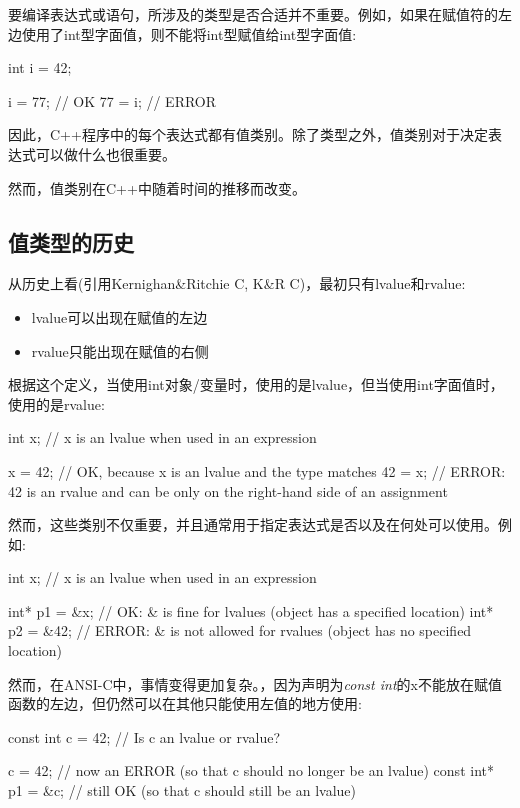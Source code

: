 要编译表达式或语句，所涉及的类型是否合适并不重要。例如，如果在赋值符的左边使用了int型字面值，则不能将int型赋值给int型字面值:

\begin{cppcode}
int i = 42;

i = 77; // OK
77 = i; // ERROR
\end{cppcode}

因此，C++程序中的每个表达式都有值类别。除了类型之外，值类别对于决定表达式可以做什么也很重要。

然而，值类别在C++中随着时间的推移而改变。

\subsection{值类型的历史}

从历史上看(引用Kernighan\&Ritchie C, K\&R C)，最初只有lvalue和rvalue:

\begin{itemize}
	\item lvalue可以出现在赋值的左边
	\item rvalue只能出现在赋值的右侧
\end{itemize}

根据这个定义，当使用int对象/变量时，使用的是lvalue，但当使用int字面值时，使用的是rvalue:

\begin{cppcode}
int x; // x is an lvalue when used in an expression

x = 42; // OK, because x is an lvalue and the type matches
42 = x; // ERROR: 42 is an rvalue and can be only on the right-hand side of an assignment
\end{cppcode}

然而，这些类别不仅重要，并且通常用于指定表达式是否以及在何处可以使用。例如:

\begin{cppcode}
int x; // x is an lvalue when used in an expression

int* p1 = &x; // OK: & is fine for lvalues (object has a specified location)
int* p2 = &42; // ERROR: & is not allowed for rvalues (object has no specified location)
\end{cppcode}

然而，在ANSI-C中，事情变得更加复杂。，因为声明为\textit{const int}的x不能放在赋值函数的左边，但仍然可以在其他只能使用左值的地方使用:

\begin{cppcode}
const int c = 42; // Is c an lvalue or rvalue?

c = 42; // now an ERROR (so that c should no longer be an lvalue)
const int* p1 = &c; // still OK (so that c should still be an lvalue)
\end{cppcode}

